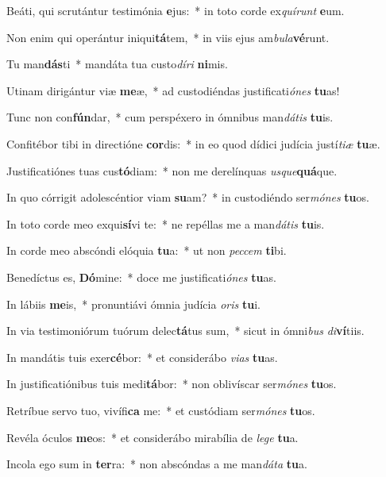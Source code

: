 \item Beáti, qui scrutántur testimónia \textbf{e}jus:~* in toto corde ex\textit{quí}\textit{runt} \textbf{e}um.
\item Non enim qui operántur iniqui\textbf{tá}tem,~* in viis ejus am\textit{bu}\textit{la}\textbf{vé}runt.
\item Tu man\textbf{dás}ti~* mandáta tua custo\textit{dí}\textit{ri} \textbf{ni}mis.
\item Utinam dirigántur viæ \textbf{me}æ,~* ad custodiéndas justificati\textit{ó}\textit{nes} \textbf{tu}as!
\item Tunc non con\textbf{fún}dar,~* cum perspéxero in ómnibus man\textit{dá}\textit{tis} \textbf{tu}is.
\item Confitébor tibi in directióne \textbf{cor}dis:~* in eo quod dídici judícia justí\textit{ti}\textit{æ} \textbf{tu}æ.
\item Justificatiónes tuas cus\textbf{tó}diam:~* non me derelínquas \textit{us}\textit{que}\textbf{quá}que.
\item In quo córrigit adolescéntior viam \textbf{su}am?~* in custodiéndo ser\textit{mó}\textit{nes} \textbf{tu}os.
\item In toto corde meo exqui\textbf{sí}vi te:~* ne repéllas me a man\textit{dá}\textit{tis} \textbf{tu}is.
\item In corde meo abscóndi elóquia \textbf{tu}a:~* ut non \textit{pec}\textit{cem} \textbf{ti}bi.
\item Benedíctus es, \textbf{Dó}mine:~* doce me justificati\textit{ó}\textit{nes} \textbf{tu}as.
\item In lábiis \textbf{me}is,~* pronuntiávi ómnia judícia \textit{o}\textit{ris} \textbf{tu}i.
\item In via testimoniórum tuórum delec\textbf{tá}tus sum,~* sicut in ómni\textit{bus} \textit{di}\textbf{ví}tiis.
\item In mandátis tuis exer\textbf{cé}bor:~* et considerábo \textit{vi}\textit{as} \textbf{tu}as.
\item In justificatiónibus tuis medi\textbf{tá}bor:~* non oblivíscar ser\textit{mó}\textit{nes} \textbf{tu}os.
\item Retríbue servo tuo, vivífi\textbf{ca} me:~* et custódiam ser\textit{mó}\textit{nes} \textbf{tu}os.
\item Revéla óculos \textbf{me}os:~* et considerábo mirabília de \textit{le}\textit{ge} \textbf{tu}a.
\item Incola ego sum in \textbf{ter}ra:~* non abscóndas a me man\textit{dá}\textit{ta} \textbf{tu}a.
